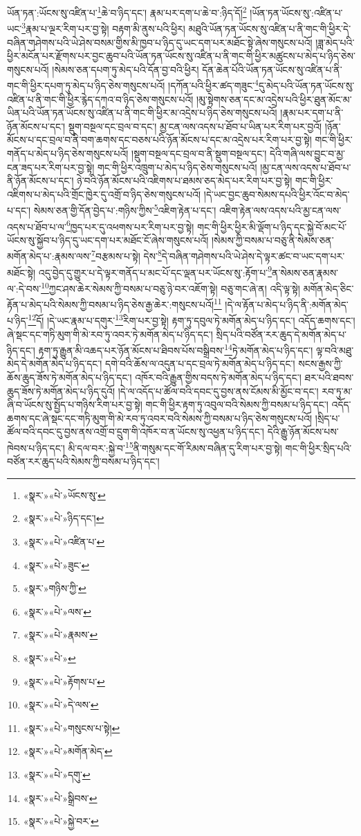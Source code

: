 ཡོན་ཏན་:ཡོངས་སུ་འཛིན་པ་\footnote{«སྣར་»«པེ་»ཡོངས་སུ་}ཆེ་བ་ཉིད་དང་། རྣམ་པར་དག་པ་ཆེ་བ་:ཉིད་དོ།\footnote{«སྣར་»«པེ་»ཉིད་དང་།} །ཡོན་ཏན་ཡོངས་སུ་:འཛིན་པ་ཡང་\footnote{«སྣར་»«པེ་»འཛིན་པ་}རྣམ་པ་ལྔར་རིག་པར་བྱ་སྟེ། བརྟག་མི་ནུས་པའི་ཕྱིར། མཐུའི་ཡོན་ཏན་ཡོངས་སུ་འཛིན་པ་ནི་གང་གི་ཕྱིར་དེ་བཞིན་གཤེགས་པའི་ཡེ་ཤེས་བསམ་གྱིས་མི་ཁྱབ་པ་ཉིད་དུ་ཡང་དག་པར་མཐོང་སྟེ་ཞེས་གསུངས་པའོ། །ཟླ་མེད་པའི་ཕྱིར་མངོན་པར་རྫོགས་པར་བྱང་ཆུབ་པའི་ཡོན་ཏན་ཡོངས་སུ་འཛིན་པ་ནི་གང་གི་ཕྱིར་མཚུངས་པ་མེད་པ་ཉིད་ཅེས་གསུངས་པའོ། །སེམས་ཅན་དཔག་ཏུ་མེད་པའི་དོན་བྱ་བའི་ཕྱིར། དོན་ཆེན་པོའི་ཡོན་ཏན་ཡོངས་སུ་འཛིན་པ་ནི་གང་གི་ཕྱིར་དཔག་ཏུ་མེད་པ་ཉིད་ཅེས་གསུངས་པའོ། །དཀོན་པའི་ཕྱིར་ཚད་གཟུང་\footnote{«སྣར་»«པེ་»ཟུང་}དུ་མེད་པའི་ཡོན་ཏན་ཡོངས་སུ་འཛིན་པ་ནི་གང་གི་ཕྱིར་རྙེད་དཀའ་བ་ཉིད་ཅེས་གསུངས་པའོ། །མུ་སྟེགས་ཅན་དང་མ་འདྲེས་པའི་ཕྱིར་ཐུན་མོང་མ་ཡིན་པའི་ཡོན་ཏན་ཡོངས་སུ་འཛིན་པ་ནི་གང་གི་ཕྱིར་མ་འདྲེས་པ་ཉིད་ཅེས་གསུངས་པའོ། །རྣམ་པར་དག་པ་ནི་ཉོན་མོངས་པ་དང་། སྡུག་བསྔལ་དང་བྲལ་བ་དང་། མྱ་ངན་ལས་འདས་པ་ཐོབ་པ་ཡིན་པར་རིག་པར་བྱའོ། །ཉོན་མོངས་པ་དང་བྲལ་བ་ནི་བག་ཆགས་དང་བཅས་པའི་ཉོན་མོངས་པ་དང་མ་འདྲེས་པར་རིག་པར་བྱ་སྟེ། གང་གི་ཕྱིར་གནོད་པ་མེད་པ་ཉིད་ཅེས་གསུངས་པའོ། །སྡུག་བསྔལ་དང་བྲལ་བ་ནི་སྡུག་བསྔལ་དང་། དེའི་གཞི་ལས་བྱུང་བ་མྱ་ངན་ཟད་པར་རིག་པར་བྱ་སྟེ། གང་གི་ཕྱིར་འཁྲུག་པ་མེད་པ་ཉིད་ཅེས་གསུངས་པའོ། །མྱ་ངན་ལས་འདས་པ་ཐོབ་པ་ནི་ཉོན་མོངས་པ་དང་། ཉེ་བའི་ཉོན་མོངས་པའི་འཇིགས་པ་ཐམས་ཅད་མེད་པར་རིག་པར་བྱ་སྟེ། གང་གི་ཕྱིར་འཇིགས་པ་མེད་པའི་གྲོང་ཁྱེར་དུ་འགྲོ་བ་ཉིད་ཅེས་གསུངས་པའོ། །དེ་ཡང་བྱང་ཆུབ་སེམས་དཔའི་ཕྱིར་འོང་བ་མེད་པ་དང་། སེམས་ཅན་གྱི་དོན་བྱེད་པ་:གཉིས་ཀྱིས་\footnote{«སྣར་»གཉིས་ཀྱི་}འཇིག་རྟེན་པ་དང་། འཇིག་རྟེན་ལས་འདས་པའི་མྱ་ངན་ལས་འདས་པ་ཐོབ་པ་ལ་\footnote{«སྣར་»«པེ་»ལས་}ཁྱད་པར་དུ་འཕགས་པར་རིག་པར་བྱ་སྟེ། གང་གི་ཕྱིར་ཕྱིར་མི་ལྡོག་པ་ཉིད་དང་སྐྱེ་བོ་མང་པོ་ཡོངས་སུ་སྐྱོབ་པ་ཉིད་དུ་ཡང་དག་པར་མཐོང་ངོ་ཞེས་གསུངས་པའོ། །སེམས་ཀྱི་བསམ་པ་བཅུ་ནི་སེམས་ཅན་མགོན་མེད་པ་:རྣམས་ལས་\footnote{«སྣར་»«པེ་»རྣམས་}བརྩམས་པ་སྟེ། དེས་\footnote{«སྣར་»«པེ་»}དེ་བཞིན་གཤེགས་པའི་ཡེ་ཤེས་དེ་ལྟར་ཚང་བ་ཡང་དག་པར་མཐོང་སྟེ། འདུ་བྱེད་དུ་གྱུར་པ་དེ་ལྟར་གནོད་པ་མང་པོ་དང་ལྡན་པར་ཡོངས་སུ་:རྟོག་པ་\footnote{«སྣར་»«པེ་»རྟོགས་པ་}ན་སེམས་ཅན་རྣམས་ལ་:དེ་བས་\footnote{«སྣར་»«པེ་»དེ་ལས་}ཀྱང་ཤས་ཆེར་སེམས་ཀྱི་བསམ་པ་བཅུ་ཉེ་བར་འཇོག་སྟེ། བཅུ་གང་ཞེ་ན། འདི་ལྟ་སྟེ། མགོན་མེད་ཅིང་རྟོན་པ་མེད་པའི་སེམས་ཀྱི་བསམ་པ་ཉིད་ཅེས་རྒྱ་ཆེར་:གསུངས་པའོ།\footnote{«སྣར་»«པེ་»གསུངས་པ་སྟེ།} །དེ་ལ་རྟོན་པ་མེད་པ་ཉིད་ནི་:མགོན་མེད་པ་ཉིད་\footnote{«སྣར་»«པེ་»མགོན་མེད་}དོ། །དེ་ཡང་རྣམ་པ་དགུར་\footnote{«སྣར་»«པེ་»དགུ་}རིག་པར་བྱ་སྟེ། རྟག་ཏུ་དབུལ་ཏེ་མགོན་མེད་པ་ཉིད་དང་། འདོད་ཆགས་དང་། ཞེ་སྡང་དང་གཏི་མུག་གི་མེ་རབ་ཏུ་འབར་ཏེ་མགོན་མེད་པ་ཉིད་དང་། སྲིད་པའི་བཙོན་རར་ཆུད་དེ་མགོན་མེད་པ་ཉིད་དང་། རྟག་ཏུ་རྒྱུན་མི་འཆད་པར་ཉོན་མོངས་པ་ཐིབས་པོས་བསྒྲིབས་\footnote{«སྣར་»«པེ་»སྒྲིབས་}ཏེ་མགོན་མེད་པ་ཉིད་དང་། ལྟ་བའི་མཐུ་མེད་དེ་མགོན་མེད་པ་ཉིད་དང་། དགེ་བའི་ཆོས་ལ་འདུན་པ་དང་བྲལ་ཏེ་མགོན་མེད་པ་ཉིད་དང་། སངས་རྒྱས་ཀྱི་ཆོས་ཆུད་ཟོས་ཏེ་མགོན་མེད་པ་ཉིད་དང་། འཁོར་བའི་རྒྱུན་གྱིས་བདས་ཏེ་མགོན་མེད་པ་ཉིད་དང་། ཐར་པའི་ཐབས་ཆུད་ཟོས་ཏེ་མགོན་མེད་པ་ཉིད་དུའོ། །དེ་ལ་འདོད་པ་ཚོལ་བའི་དབང་དུ་བྱས་ནས་ངོམས་མི་མྱོང་བ་དང་། རབ་ཏུ་མ་ཞི་བ་ཡོངས་སུ་སྤྱོད་པ་གཉིས་རིག་པར་བྱ་སྟེ། གང་གི་ཕྱིར་རྟག་ཏུ་འབུལ་བའི་སེམས་ཀྱི་བསམ་པ་ཉིད་དང་། འདོད་ཆགས་དང་ཞེ་སྡང་དང་གཏི་མུག་གི་མེ་རབ་ཏུ་འབར་བའི་སེམས་ཀྱི་བསམ་པ་ཉིད་ཅེས་གསུངས་པའོ། །སྲིད་པ་ཚོལ་བའི་དབང་དུ་བྱས་ནས་འགྲོ་བ་དྲུག་གི་འཁོར་བ་ན་ཡོངས་སུ་འཕྱན་པ་ཉིད་དང་། དེའི་རྒྱུ་ཉོན་མོངས་པས་ཁེབས་པ་ཉིད་དང་། མི་དལ་བར་:སྐྱེ་བ་\footnote{«སྣར་»«པེ་»སྐྱེ་བར་}ནི་གསུམ་དང་གོ་རིམས་བཞིན་དུ་རིག་པར་བྱ་སྟེ། གང་གི་ཕྱིར་སྲིད་པའི་བཙོན་རར་ཆུད་པའི་སེམས་ཀྱི་བསམ་པ་ཉིད་དང་། 